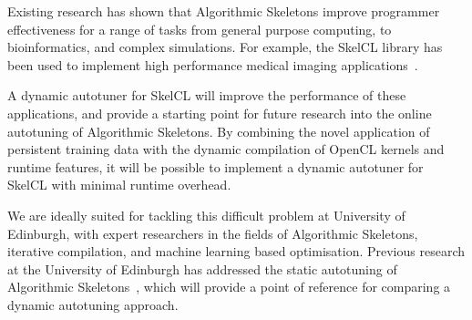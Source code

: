 Existing research has shown that Algorithmic Skeletons improve
programmer effectiveness for a range of tasks from general purpose
computing, to bioinformatics, and complex simulations. For example,
the SkelCL library has been used to implement high performance medical
imaging applications~\cite{Steuwer2012}.

A dynamic autotuner for SkelCL will improve the performance of these
applications, and provide a starting point for future research into
the online autotuning of Algorithmic Skeletons. By combining the novel
application of persistent training data with the dynamic compilation
of OpenCL kernels and runtime features, it will be possible to
implement a dynamic autotuner for SkelCL with minimal runtime
overhead.

We are ideally suited for tackling this difficult problem at
University of Edinburgh, with expert researchers in the fields of
Algorithmic Skeletons, iterative compilation, and machine learning
based optimisation. Previous research at the University of Edinburgh
has addressed the static autotuning of Algorithmic
Skeletons~\cite{Collins2012, Collins2013}, which will provide a point
of reference for comparing a dynamic autotuning approach.
